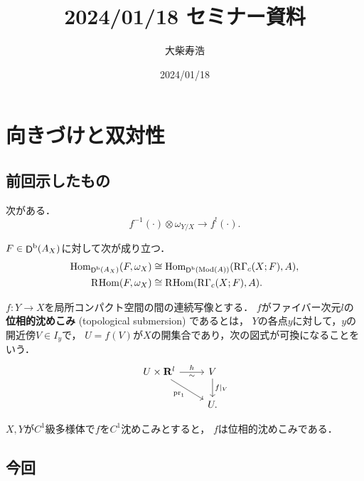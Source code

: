 
\title{2024/01/18 セミナー資料}
\author{大柴寿浩}
\date{2024/01/18}

\maketitle


\section{向きづけと双対性{\cite[3.3]{KS90}}}

\subsection{前回示したもの}
次がある．
\begin{equation}
    f^{-1}(\cdot)\otimes\omega_{Y/X}\to f^!(\cdot).\label{eq:VerdierDual}
\end{equation}


\(F\in\mathop{\mathsf{D}}\nolimits^\mathrm{b}(A_X)\)に対して次が成り立つ．
\begin{align}
    \mathop{\mathrm{Hom}}\nolimits_{\mathop{\mathsf{D}}\nolimits^\mathrm{b}(A_X)}(F,\omega_X)
    &\cong
    \mathop{\mathrm{Hom}}\nolimits_{\mathop{\mathsf{D}}\nolimits^\mathrm{b}(\mathop{\mathrm{Mod}}\nolimits(A))}(\mathop{\mathrm{R}\hspace{-0pt}\Gamma}\nolimits_c(X;F),A),\\
    \mathop{\mathrm{R}\hspace{-1.5pt}\mathop{\mathrm{Hom}}\nolimits}\nolimits(F,\omega_X)
    &\cong
    \mathop{\mathrm{R}\hspace{-1.5pt}\mathop{\mathrm{Hom}}\nolimits}\nolimits(\mathop{\mathrm{R}\hspace{-0pt}\Gamma}\nolimits_c(X;F),A).\label{eq:RPV-dual}
\end{align}

\begin{DFN}
    \(f\colon Y\to X\)を局所コンパクト空間の間の連続写像とする．
    \(f\)がファイバー次元\(l\)の
    \textbf{位相的沈めこみ} (topological submersion) であるとは，
    \(Y\)の各点\(y\)に対して，\(y\)の開近傍\(V\in I_y\)で，
    \(U=f(V)\)が\(X\)の開集合であり，次の図式が可換になることをいう．
    \[\begin{tikzcd}
        U\times \rr^l
        \arrow[rd,"\pr_1"']
        \arrow[r,"h", "\sim"']
        &
        V
        \arrow[d,"f\rvert_V"]
        \\
        {}&U. 
    \end{tikzcd}\]
\end{DFN}
\begin{EG*}
    \(X,Y\)が\(C^1\)級多様体で\(f\)を\(C^1\)沈めこみとすると，
    \(f\)は位相的沈めこみである．
\end{EG*}
\subsection{今回}

